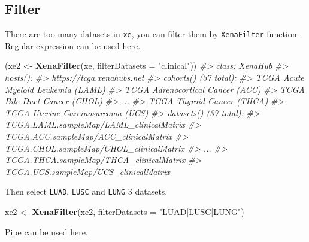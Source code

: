 \documentclass[nofonts,]{tufte-handout}
\newenvironment{Shaded}{\begin{snugshade}}{\end{snugshade}}
\newcommand{\CommentTok}[1]{\textcolor[rgb]{0.56,0.35,0.01}{\textit{#1}}}
\newcommand{\DataTypeTok}[1]{\textcolor[rgb]{0.13,0.29,0.53}{#1}}
\newcommand{\KeywordTok}[1]{\textcolor[rgb]{0.13,0.29,0.53}{\textbf{#1}}}
\newcommand{\NormalTok}[1]{#1}
\newcommand{\OperatorTok}[1]{\textcolor[rgb]{0.81,0.36,0.00}{\textbf{#1}}}
\newcommand{\StringTok}[1]{\textcolor[rgb]{0.31,0.60,0.02}{#1}}
\begin{document}
\hypertarget{filter}{%
\subsection{Filter}\label{filter}}

There are too many datasets in \texttt{xe}, you can filter them by
\texttt{XenaFilter} function. Regular expression can be used here.

\begin{Shaded}
\begin{Highlighting}[]
\NormalTok{(xe2 <-}\StringTok{ }\KeywordTok{XenaFilter}\NormalTok{(xe, }\DataTypeTok{filterDatasets =} \StringTok{"clinical"}\NormalTok{))}
\CommentTok{#> class: XenaHub }
\CommentTok{#> hosts():}
\CommentTok{#>   https://tcga.xenahubs.net}
\CommentTok{#> cohorts() (37 total):}
\CommentTok{#>   TCGA Acute Myeloid Leukemia (LAML)}
\CommentTok{#>   TCGA Adrenocortical Cancer (ACC)}
\CommentTok{#>   TCGA Bile Duct Cancer (CHOL)}
\CommentTok{#>   ...}
\CommentTok{#>   TCGA Thyroid Cancer (THCA)}
\CommentTok{#>   TCGA Uterine Carcinosarcoma (UCS)}
\CommentTok{#> datasets() (37 total):}
\CommentTok{#>   TCGA.LAML.sampleMap/LAML_clinicalMatrix}
\CommentTok{#>   TCGA.ACC.sampleMap/ACC_clinicalMatrix}
\CommentTok{#>   TCGA.CHOL.sampleMap/CHOL_clinicalMatrix}
\CommentTok{#>   ...}
\CommentTok{#>   TCGA.THCA.sampleMap/THCA_clinicalMatrix}
\CommentTok{#>   TCGA.UCS.sampleMap/UCS_clinicalMatrix}
\end{Highlighting}
\end{Shaded}

Then select \texttt{LUAD}, \texttt{LUSC} and \texttt{LUNG} 3 datasets.

\begin{Shaded}
\begin{Highlighting}[]
\NormalTok{xe2 <-}\StringTok{ }\KeywordTok{XenaFilter}\NormalTok{(xe2, }\DataTypeTok{filterDatasets =} \StringTok{"LUAD|LUSC|LUNG"}\NormalTok{)}
\end{Highlighting}
\end{Shaded}

Pipe can be used here.

\begin{Shaded}
\end{Shaded}
\end{document}
